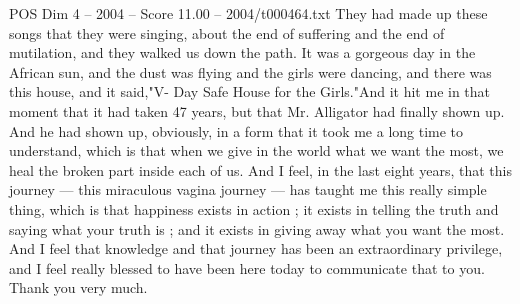 \begin{textsample}{POS Dim 4 – 2004 – Score 11.00 – 2004/t000464.txt}
They had made up these songs that they were singing, about the end of suffering and the end of mutilation, and they walked us down the path.
It was a gorgeous day in the African sun, and the dust was flying and the girls were dancing, and there was this house, and it said,"V- Day Safe House for the Girls."And it hit me in that moment that it had taken 47 years, but that Mr.
Alligator had finally shown up.
And he had shown up, obviously, in a form that it took me a long time to understand, which is that when we give in the world what we want the most, we heal the broken part inside each of us.
And I feel, in the last eight years, that this journey — this miraculous vagina journey — has taught me this really simple thing, which is that happiness exists in action ; it exists in telling the truth and saying what your truth is ; and it exists in giving away what you want the most.
And I feel that knowledge and that journey has been an extraordinary privilege, and I feel really blessed to have been here today to communicate that to you.
Thank you very much.

\end{textsample}
